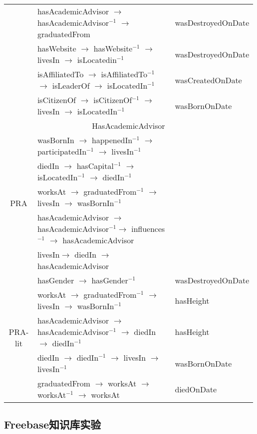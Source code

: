 \begin{table}[htbp]
\begin{tabular}{cp{10.3cm}|p{3.7cm}|}
          & hasAcademicAdvisor $\to$ hasAcademicAdvisor$^{-1}$ $\to$ graduatedFrom &wasDestroyedOnDate \\
          & hasWebsite $\to$ hasWebsite$^{-1}$ $\to$ livesIn $\to$ isLocatedin$^{-1}$ & wasDestroyedOnDate\\
          & isAffiliatedTo $\to$ isAffiliatedTo$^{-1}$ $\to$ isLeaderOf $\to$ isLocatedIn$^{-1}$ & wasCreatedOnDate \\
          & isCitizenOf $\to$ isCitizenOf$^{-1}$ $\to$ livesIn $\to$ isLocatedIn$^{-1}$ & wasBornOnDate \\
    \hline
    \multicolumn{3}{c}{HasAcademicAdvisor} \\
    \hline
    \multirow{5}[2]{*}{PRA} & wasBornIn $\to$ happenedIn$^{-1}$ $\to$ participatedIn$^{-1}$ $\to$ livesIn$^{-1}$ &  \\
          & diedIn $\to$ hasCapital$^{-1}$ $\to$ isLocatedIn$^{-1}$ $\to$ diedIn$^{-1}$ &  \\
          & worksAt $\to$ graduatedFrom$^{-1}$ $\to$ livesIn $\to$ wasBornIn$^{-1}$ &  \\
          & hasAcademicAdvisor $\to$ hasAcademicAdvisor$^{-1}$$\to$ influences$^{-1}$ $\to$ hasAcademicAdvisor &  \\
          & livesIn$\to$ diedIn $\to$ hasAcademicAdvisor &  \\
    \hline
    \multirow{5}[2]{*}{PRA-lit} & hasGender $\to$ hasGender$^{-1}$ & wasDestroyedOnDate \\
          & worksAt $\to$ graduatedFrom$^{-1}$ $\to$ livesIn $\to$ wasBornIn$^{-1}$ & hasHeight \\
          & hasAcademicAdvisor $\to$ hasAcademicAdvisor$^{-1}$ $\to$ diedIn $\to$ diedIn$^{-1}$ & hasHeight \\
          & diedIn $\to$ diedIn$^{-1}$ $\to$ livesIn $\to$ livesIn$^{-1}$ & wasBornOnDate \\
          & graduatedFrom $\to$ worksAt $\to$ worksAt$^{-1}$ $\to$ worksAt  & diedOnDate \\
    \hline
    \hline
    \end{tabular}%
  \label{tab:lit-rel-kbc}%
\end{table}%


\subsection{Freebase知识库实验}

